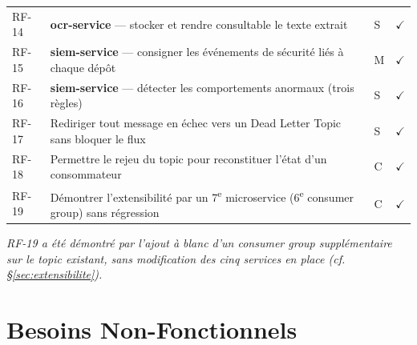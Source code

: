 \documentclass[12pt,a4paper,openany]{report}
\begin{document}
\begin{longtable}{P{1.1cm}P{7.6cm}P{1.1cm}P{1.3cm}}
      RF-14 & \textbf{ocr-service} --- stocker et rendre consultable le texte extrait & S & $\checkmark$ \\[3pt]
      RF-15 & \textbf{siem-service} --- consigner les \'ev\'enements de s\'ecurit\'e li\'es \`a chaque d\'ep\^ot & M & $\checkmark$ \\[3pt]
      RF-16 & \textbf{siem-service} --- d\'etecter les comportements anormaux (trois r\`egles) & S & $\checkmark$ \\[3pt]
      RF-17 & Rediriger tout message en \'echec vers un Dead Letter Topic sans bloquer le flux & S & $\checkmark$ \\[3pt]
      RF-18 & Permettre le rejeu du topic pour reconstituer l'\'etat d'un consommateur & C & $\checkmark$ \\[3pt]
      RF-19 & D\'emontrer l'extensibilit\'e par un 7\textsuperscript{e} microservice (6\textsuperscript{e} consumer group) sans r\'egression & C & $\checkmark$ \\
    \end{longtable}

    \noindent\textit{RF-19 a \'et\'e d\'emontr\'e par l'ajout \`a blanc d'un consumer group suppl\'ementaire sur le topic existant, sans modification des cinq services en place (cf. \S\ref{sec:extensibilite}).}

    \section{Besoins Non-Fonctionnels}
\end{document}
